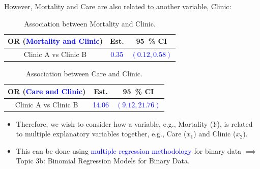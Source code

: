 \documentclass[oneside]{book}\usepackage[]{graphicx}\usepackage[svgnames]{xcolor}
\begin{document}
However, Mortality and Care are also related to another variable, Clinic:
\begin{table}[!htbp]
      \centering
      \begin{tabular}{ccc}
            OR (\textcolor{Blue}{Mortality and Clinic}) & Est.                   & \qty{95}{\percent} CI             \\
            \midrule
            Clinic A vs Clinic B                        & \textcolor{Blue}{0.35} & \textcolor{Blue}{$ (0.12,0.58) $} \\
            \bottomrule
      \end{tabular}
      \caption{Association between Mortality and Clinic.}
\end{table}
\begin{table}[!htbp]
      \centering
      \begin{tabular}{ccc}
            OR (\textcolor{Blue}{Care and Clinic}) & Est.                    & \qty{95}{\percent} CI              \\
            \midrule
            Clinic A vs Clinic B                   & \textcolor{Blue}{14.06} & \textcolor{Blue}{$ (9.12,21.76) $} \\
            \bottomrule
      \end{tabular}
      \caption{Association between Care and Clinic.}
\end{table}
\begin{itemize}
      \item Therefore, we wish to consider how a variable, e.g., Mortality ($ Y $), is related to
            multiple explanatory variables together, e.g., Care ($ x_1 $) and Clinic ($ x_2 $).
      \item This can be done using \textcolor{Blue}{multiple regression methodology} for binary data $ \implies $
            Topic 3b: Binomial Regression Models for Binary Data.
\end{itemize}
\end{document}

